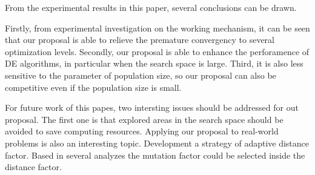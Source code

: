 From the experimental results in this paper, several conclusions can be drawn.
%

Firstly, from experimental investigation on the working mechanism, it can be seen that our proposal is able to relieve the premature convergency to several optimization levels.
%
Secondly, our proposal is able to enhance the perforamence of DE algorithms, in particular when the search space is large.
%
Third, it is also less sensitive to the parameter of population size, so our proposal can also be competitive even if the population size is small.
%

For future work of this papes, two intersting issues should be addressed for out proposal.
%
The first one is that explored areas in the search space should be avoided to save computing resources.
%
Applying our proposal to real-world problems is also an interesting topic.
%
Development a strategy of adaptive distance factor.
%
Based in several analyzes the mutation factor could be selected inside the distance factor.
